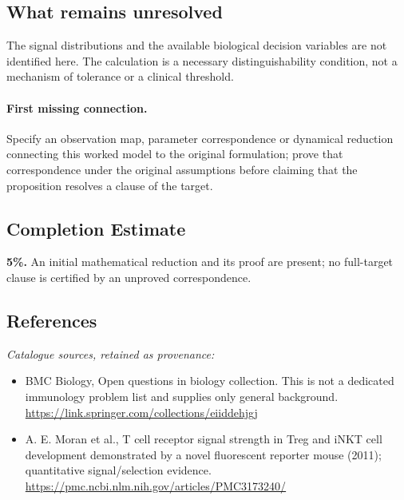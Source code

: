 \documentclass[11pt]{article}
\begin{document}
\subsection{What remains unresolved}
The signal distributions and the available biological decision variables are not identified here. The calculation is a necessary distinguishability condition, not a mechanism of tolerance or a clinical threshold.
\paragraph{First missing connection.} Specify an observation map, parameter correspondence or dynamical reduction connecting this worked model to the original formulation; prove that correspondence under the original assumptions before claiming that the proposition resolves a clause of the target.
\subsection{Completion Estimate}
\textbf{5\%.} An initial mathematical reduction and its proof are present; no full-target clause is certified by an unproved correspondence.
\subsection{References}
\noindent\emph{Catalogue sources, retained as provenance:}
\begin{itemize}
\item BMC Biology, Open questions in biology collection. This is not a dedicated immunology problem list and supplies only general background. \url{https://link.springer.com/collections/eiiddehjgj}
\item A. E. Moran et al., T cell receptor signal strength in Treg and iNKT cell development demonstrated by a novel fluorescent reporter mouse (2011); quantitative signal/selection evidence. \url{https://pmc.ncbi.nlm.nih.gov/articles/PMC3173240/}
\end{itemize}
\clearpage


\appendix
\end{document}
